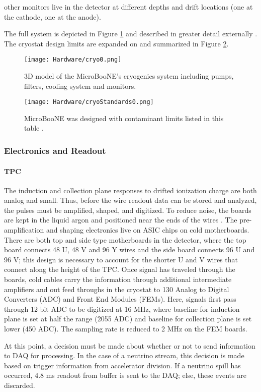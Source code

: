  other monitors live in the detector at different depths and drift locations (one at the cathode, one at the anode). 
\par The full system is depicted in Figure \ref{fig:cryo0} and described in greater detail externally \cite{bib:purity} \cite{bib:purity2}. The cryostat design limits are expanded on and summarized in Figure \ref{fig:cryo1}.

\begin{figure}[h!]
\centering
\texttt{[image: Hardware/cryo0.png]}
\caption{ 3D model of the MicroBooNE's cryogenics system including pumps, filters, cooling system and monitors.  } 
\label{fig:cryo0}
\end{figure}
  

\begin{figure}[h!]
\centering
\texttt{[image: Hardware/cryoStandards0.png]}
\caption{ MicroBooNE was designed with contaminant limits listed in this table \cite{bib:uboone_JINST}. }
\label{fig:cryo1}
\end{figure}

\subsubsection{Electronics and Readout}
\paragraph{TPC}
The induction and collection plane responses to drifted ionization charge are both analog and small.  Thus, before the wire readout data can be stored and analyzed, the pulses must be amplified, shaped, and digitized.  To reduce noise, the boards are kept in the liquid argon and positioned near the ends of the wires \cite{bib:uboone_JINST}. The pre-amplification and shaping electronics live on ASIC chips on cold motherboards. There are both top and side type motherboards in the detector, where the top board connects 48 U, 48 V and 96 Y wires and the side board connects 96 U and 96 V; this design is necessary to account for the shorter U and V wires that connect along the height of the TPC. Once signal has traveled through the boards, cold cables carry the information through additional intermediate amplifiers and out feed throughs in the cryostat to 130 Analog to Digital Converters (ADC) and Front End Modules (FEMs). Here, signals first pass through 12 bit ADC to be digitized at 16 MHz, where baseline for induction plane is set at half the range (2055 ADC) and baseline for collection plane is set lower (450 ADC). The sampling rate is reduced to 2 MHz on the FEM boards.
\par At this point, a decision must be made about whether or not to send information to DAQ for processing. In the case of a neutrino stream, this decision is made based on trigger information from accelerator division. If a neutrino spill has occurred, 4.8 ms readout from buffer is sent to the DAQ; else, these events are discarded. 
